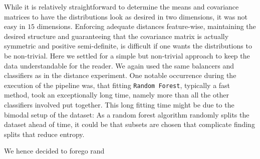 While it is relatively straightforward to determine the means and covariance matrices to have the distributions look as desired in two dimensions, 
it was not easy in $15$ dimensions. 
Enforcing adequate distances feature-wise, maintaining the desired structure and guaranteeing that the covariance matrix is actually symmetric and positive semi-definite,
is difficult if one wants the distributions to be non-trivial. 
Here we settled for a simple but non-trivial approach to keep the data understandable for the reader.
We again used the same balancers and classifiers as in the distance experiment. 
One notable occurrence during the execution of the pipeline was, that fitting \texttt{Random Forest}, typically a fast method, took an exceptionally long time,
namely more than all the other classifiers involved put together.  
This long fitting time might be due to the bimodal setup of the dataset: As a random forest algorithm randomly splits the dataset ahead of time, it could be that subsets 
are chosen that complicate finding splits that reduce entropy.

We hence decided to forego rand

















